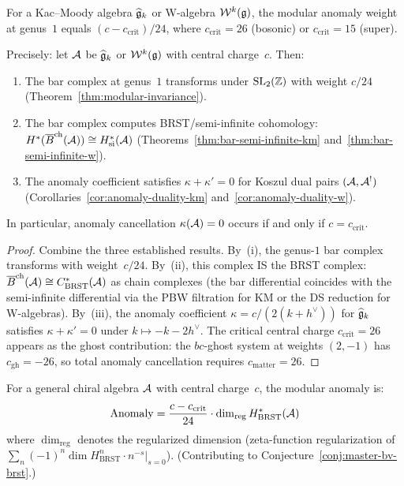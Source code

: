 \begin{theorem}
\label{thm:modular-anomaly-km-w}
For a Kac--Moody algebra $\widehat{\mathfrak{g}}_k$ or W-algebra
$\mathcal{W}^k(\mathfrak{g})$, the modular anomaly weight at
genus~$1$ equals $(c - c_{\mathrm{crit}})/24$, where
$c_{\mathrm{crit}} = 26$ \textup{(}bosonic\textup{)}
or $c_{\mathrm{crit}} = 15$ \textup{(}super\textup{)}.

Precisely: let $\mathcal{A}$ be $\widehat{\mathfrak{g}}_k$ or
$\mathcal{W}^k(\mathfrak{g})$ with central charge~$c$.  Then:
\begin{enumerate}[label=\textup{(\roman*)}]
\item The bar complex at genus~$1$ transforms under
  $\mathrm{SL}_2(\mathbb{Z})$ with weight $c/24$
  \textup{(}Theorem~\textup{\ref{thm:modular-invariance})}.
\item The bar complex computes BRST\slash semi-infinite
  cohomology:
  $H^*(\overline{B}^{\mathrm{ch}}(\mathcal{A})) \cong
  H^*_{\mathrm{si}}(\mathcal{A})$
  \textup{(}Theorems~\textup{\ref{thm:bar-semi-infinite-km}}
  and~\textup{\ref{thm:bar-semi-infinite-w})}.
\item The anomaly coefficient satisfies $\kappa + \kappa' = 0$
  for Koszul dual pairs $(\mathcal{A}, \mathcal{A}^!)$
  \textup{(}Corollaries~\textup{\ref{cor:anomaly-duality-km}}
  and~\textup{\ref{cor:anomaly-duality-w})}.
\end{enumerate}
In particular, anomaly cancellation
$\kappa(\mathcal{A}) = 0$ occurs if and only if $c = c_{\mathrm{crit}}$.
\end{theorem}

\begin{proof}
Combine the three established results.
By~(i), the genus-$1$ bar complex transforms with
weight~$c/24$.  By~(ii), this complex IS the BRST
complex: $\overline{B}^{\mathrm{ch}}(\mathcal{A}) \cong
C^*_{\mathrm{BRST}}(\mathcal{A})$ as chain complexes
(the bar differential coincides with the semi-infinite
differential via the PBW filtration for KM or the
DS reduction for W-algebras).  By~(iii), the anomaly
coefficient $\kappa = c/(2(k+h^\vee))$ for
$\widehat{\mathfrak{g}}_k$ satisfies $\kappa + \kappa' = 0$
under $k \mapsto -k - 2h^\vee$.  The critical
central charge $c_{\mathrm{crit}} = 26$ appears as
the ghost contribution: the $bc$-ghost system at
weights $(2,-1)$ has $c_{\mathrm{gh}} = -26$, so total
anomaly cancellation requires
$c_{\mathrm{matter}} = 26$.
\end{proof}

\begin{conjecture}
\label{conj:modular-anomaly-brst}
For a general chiral algebra $\mathcal{A}$ with central charge~$c$,
the modular anomaly is:
\[
\mathrm{Anomaly} = \frac{c - c_{\mathrm{crit}}}{24}
\cdot \dim_{\mathrm{reg}} H^*_{\mathrm{BRST}}(\mathcal{A})
\]
where $\dim_{\mathrm{reg}}$ denotes the regularized
dimension \textup{(}zeta-function regularization of
$\sum_n (-1)^n \dim H^n_{\mathrm{BRST}} \cdot
n^{-s}|_{s=0}$\textup{)}.
(Contributing to Conjecture~\ref{conj:master-bv-brst}.)
\end{conjecture}


